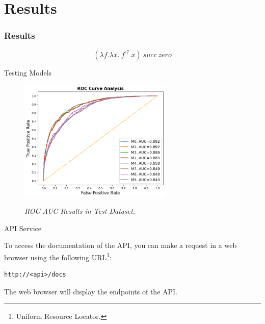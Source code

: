 \documentclass[dvipsnames,mathserif]{beamer}
\begin{document}
{    \section{Results}

    \begin{frame}
      \frametitle{Results}


      \[(\lambda f. \lambda x.\ f^{\circ 7}\ x)\ succ\ zero\]
    \end{frame}


    \begin{frame}
      \large Testing Models
      \vspace{0.25cm}
      \begin{figure}[H]
        \centering
        \includegraphics[width=0.65\textwidth]{images/rocaucanalysis-all.png}
        \caption[ROC-AUC Results in Test Dataset]{\textit{ROC-AUC Results in Test Dataset. }}
        {\label{fig:rocaucanalysis-all}}
      \end{figure}

    \end{frame}

    \begin{frame}[fragile]

      \large API Service
      \vspace{0.25cm}

      \footnotesize
      To access the documentation of the API, you can make a request in a web
      browser using the following URL\footnote{Uniform Resource Locator.}:

      \vspace{0.1cm}

      \begin{Verbatim}[fontsize=\tiny]
http://<api>/docs
      \end{Verbatim}

      The web browser will display the endpoints of the API.


\end{frame}}
\end{document}
